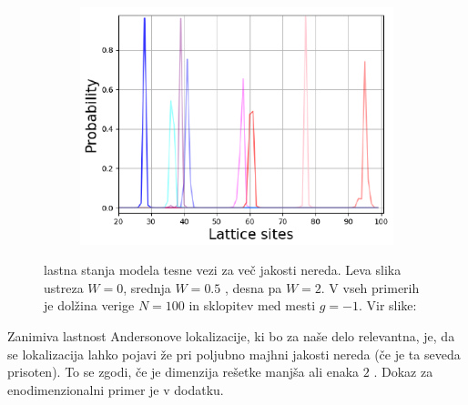 \begin{figure}[H]
\begin{subfigure}{.33\textwidth}
\includegraphics[width=\linewidth]{Figures/Anderson2.pdf}
\end{subfigure}
\caption{lastna stanja modela tesne vezi za več jakosti nereda. Leva slika ustreza $W=0$, srednja $W=0.5$ , desna pa $W=2$. V vseh primerih je dolžina verige $N=100$ in sklopitev med mesti $g=-1$. Vir slike: \cite{anderson}}
\label{fig:AndersonW}
\end{figure}
Zanimiva lastnost Andersonove lokalizacije, ki bo za naše delo relevantna, je, da se lokalizacija lahko pojavi že pri poljubno majhni jakosti nereda (če je ta seveda prisoten).
To se zgodi, če je dimenzija rešetke manjša ali enaka $2$ \cite{anderson}. Dokaz za enodimenzionalni primer je v dodatku.


